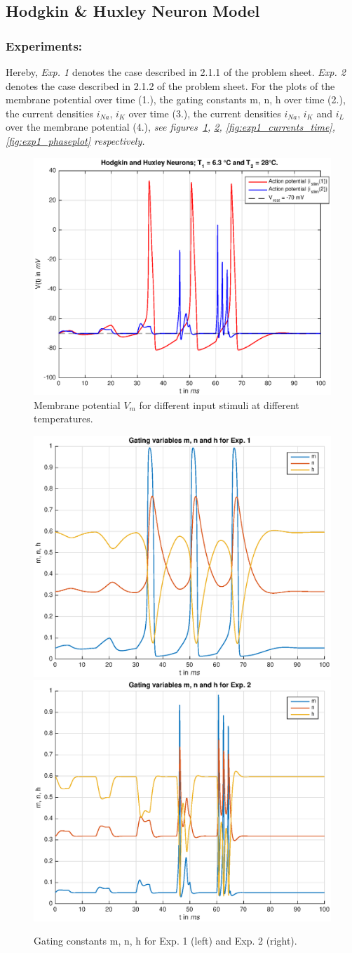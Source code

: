 \documentclass[
a4paper, 
12pt, 
]{article}
\begin{document}
	
	\subsection{Hodgkin \& Huxley Neuron Model}
	\subsubsection{Experiments:}
	Hereby, \emph{Exp. 1} denotes the case described in 2.1.1 of the problem sheet. \emph{Exp. 2} denotes the case described in 2.1.2 of the problem sheet. 
For the plots of the membrane potential over time (1.), the gating constants m, n, h over time (2.), the current densities $i_{Na}$, $i_K$ over time (3.), the current densities $i_{Na}$, $i_K$ and $i_L$ over the membrane potential (4.), \emph{see figures~\ref{fig:hodgkin_huy_Vm}, \ref{fig:exp1_mnh}, \ref{fig:exp1_currents_time}, \ref{fig:exp1_phaseplot} respectively.}
\begin{figure}[h]
\centering
\includegraphics[width=0.7\linewidth]{Plots/hodgkin_huy_Vm}
\caption{Membrane potential $V_m$ for different input stimuli at different temperatures.}
\label{fig:hodgkin_huy_Vm}
\end{figure}
\begin{figure}[h]
\centering
\includegraphics[width=0.45\linewidth]{Plots/exp1_mnh}
\includegraphics[width=0.45\linewidth]{Plots/exp2_mnh}
\caption{Gating constants m, n, h for Exp. 1 (left) and Exp. 2 (right).}
\label{fig:exp1_mnh}
\end{figure}
\end{document}
